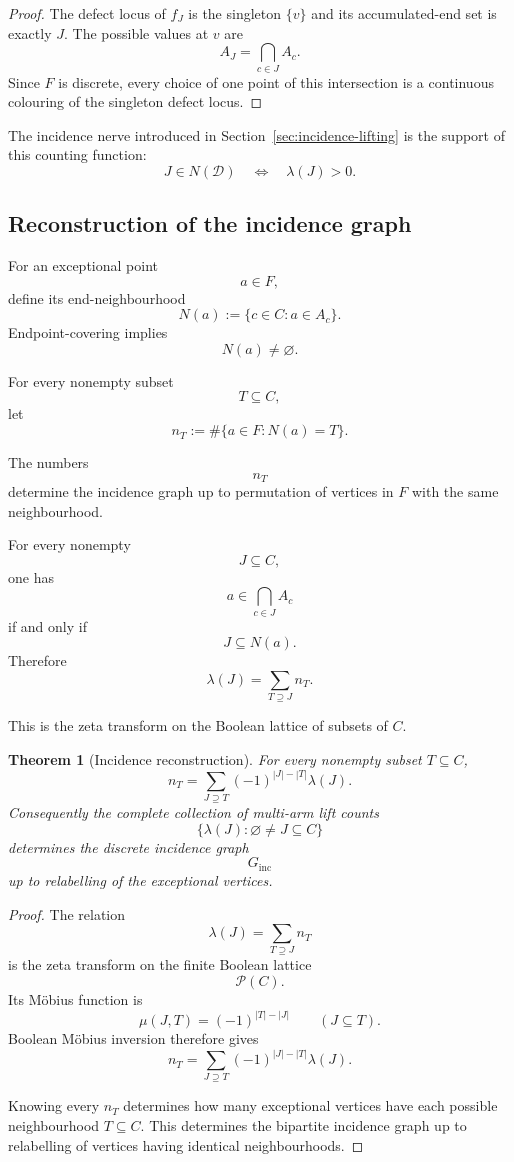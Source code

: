 \documentclass[11pt]{article}
\theoremstyle{plain}
\newtheorem{theorem}{Theorem}[section]
\theoremstyle{definition}
\begin{document}
\begin{proof}
The defect locus of $f_J$ is the singleton $\{v\}$ and its accumulated-end
set is exactly $J$.  The possible values at $v$ are
\[
A_J
=
\bigcap_{c\in J}A_c.
\]
Since $F$ is discrete, every choice of one point of this intersection is
a continuous colouring of the singleton defect locus.
\end{proof}

The incidence nerve introduced in
Section~\ref{sec:incidence-lifting} is the support of this counting function:
\[
J\in N(\mathcal D)
\quad\Longleftrightarrow\quad
\lambda(J)>0.
\]


\subsection{Reconstruction of the incidence graph}
\label{subsec:graph-reconstruction}

For an exceptional point
\[
a\in F,
\]
define its end-neighbourhood
\[
N(a)
:=
\{c\in C:a\in A_c\}.
\]
Endpoint-covering implies
\[
N(a)\neq\varnothing.
\]

For every nonempty subset
\[
T\subseteq C,
\]
let
\[
n_T
:=
\#\{a\in F:N(a)=T\}.
\]

The numbers
\[
n_T
\]
determine the incidence graph up to permutation of vertices in $F$ with
the same neighbourhood.

For every nonempty
\[
J\subseteq C,
\]
one has
\[
a\in
\bigcap_{c\in J}A_c
\]
if and only if
\[
J\subseteq N(a).
\]
Therefore
\[
\lambda(J)
=
\sum_{T\supseteq J}n_T.
\]

This is the zeta transform on the Boolean lattice of subsets of $C$.

\begin{theorem}[Incidence reconstruction]
\label{thm:incidence-reconstruction}
For every nonempty subset $T\subseteq C$,
\[
n_T
=
\sum_{J\supseteq T}
(-1)^{|J|-|T|}
\lambda(J).
\]
Consequently the complete collection of multi-arm lift counts
\[
\{\lambda(J):\varnothing\neq J\subseteq C\}
\]
determines the discrete incidence graph
\[
G_{\mathrm{inc}}
\]
up to relabelling of the exceptional vertices.
\end{theorem}

\begin{proof}
The relation
\[
\lambda(J)
=
\sum_{T\supseteq J}n_T
\]
is the zeta transform on the finite Boolean lattice
\[
\mathcal P(C).
\]
Its M\"obius function is
\[
\mu(J,T)
=
(-1)^{|T|-|J|}
\qquad(J\subseteq T).
\]
Boolean M\"obius inversion therefore gives
\[
n_T
=
\sum_{J\supseteq T}
(-1)^{|J|-|T|}
\lambda(J).
\]

Knowing every $n_T$ determines how many exceptional vertices have each
possible neighbourhood $T\subseteq C$.  This determines the bipartite
incidence graph up to relabelling of vertices having identical
neighbourhoods.
\end{proof}
\end{document}
